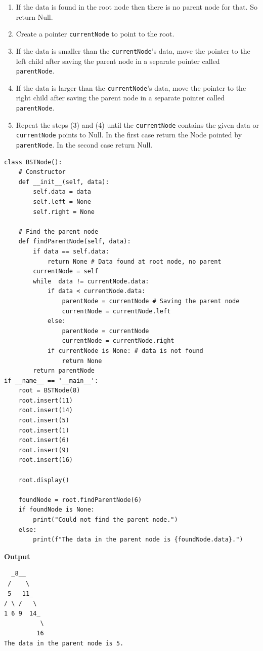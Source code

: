 \documentclass[a4paper,11pt]{book}
\begin{document}
\begin{enumerate}
    \item If the data is found in the root node then there is no parent node for that. So return Null.
    \item Create a pointer \lstinline{currentNode} to point to the root.
    \item If the data is smaller than the \lstinline{currentNode}'s data, move the pointer to the left child after saving the parent node in a separate pointer called \lstinline{parentNode}.
    \item If the data is larger than the \lstinline{currentNode}'s data, move the pointer to the right child after saving the parent node in a separate pointer called \lstinline{parentNode}.
    \item Repeat the steps (3) and (4) until the \lstinline{currentNode} contains the given data or \lstinline{currentNode} points to Null. In the first case return the Node pointed by \lstinline{parentNode}. In the second case return Null.
\end{enumerate}
\begin{lstlisting}
class BSTNode():
    # Constructor
    def __init__(self, data):
        self.data = data
        self.left = None
        self.right = None
        
    # Find the parent node
    def findParentNode(self, data):
        if data == self.data:
            return None # Data found at root node, no parent
        currentNode = self
        while  data != currentNode.data:
            if data < currentNode.data:
                parentNode = currentNode # Saving the parent node
                currentNode = currentNode.left
            else:
                parentNode = currentNode
                currentNode = currentNode.right
            if currentNode is None: # data is not found
                return None
        return parentNode
if __name__ == '__main__':
    root = BSTNode(8)
    root.insert(11)
    root.insert(14)
    root.insert(5)
    root.insert(1)
    root.insert(6)
    root.insert(9)
    root.insert(16)

    root.display()
    
    foundNode = root.findParentNode(6)
    if foundNode is None:
        print("Could not find the parent node.")
    else:
        print(f"The data in the parent node is {foundNode.data}.")
\end{lstlisting}
\textbf{Output}
\begin{lstlisting}
  _8__     
 /    \    
 5   11_   
/ \ /   \  
1 6 9  14_ 
          \
         16
The data in the parent node is 5.
\end{lstlisting}
\end{document}
